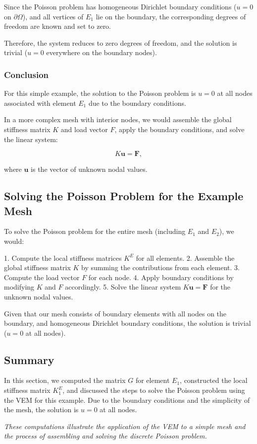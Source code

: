 \documentclass[class=article, crop=false]{standalone}
\begin{document}
Since the Poisson problem has homogeneous Dirichlet boundary conditions ($u = 0$ on $\partial\Omega$), and all vertices of $E_1$ lie on the boundary, the corresponding degrees of freedom are known and set to zero.

Therefore, the system reduces to zero degrees of freedom, and the solution is trivial ($u = 0$ everywhere on the boundary nodes).

\subsubsection{Conclusion}

For this simple example, the solution to the Poisson problem is $u = 0$ at all nodes associated with element $E_1$ due to the boundary conditions.

In a more complex mesh with interior nodes, we would assemble the global stiffness matrix $K$ and load vector $F$, apply the boundary conditions, and solve the linear system:

\[
K \mathbf{u} = \mathbf{F},
\]

where $\mathbf{u}$ is the vector of unknown nodal values.

\subsection{Solving the Poisson Problem for the Example Mesh}

To solve the Poisson problem for the entire mesh (including $E_1$ and $E_2$), we would:

1. Compute the local stiffness matrices $K^E$ for all elements.
2. Assemble the global stiffness matrix $K$ by summing the contributions from each element.
3. Compute the load vector $F$ for each node.
4. Apply boundary conditions by modifying $K$ and $F$ accordingly.
5. Solve the linear system $K \mathbf{u} = \mathbf{F}$ for the unknown nodal values.

Given that our mesh consists of boundary elements with all nodes on the boundary, and homogeneous Dirichlet boundary conditions, the solution is trivial ($u = 0$ at all nodes).

\subsection{Summary}

In this section, we computed the matrix $G$ for element $E_1$, constructed the local stiffness matrix $K_1^E$, and discussed the steps to solve the Poisson problem using the VEM for this example. Due to the boundary conditions and the simplicity of the mesh, the solution is $u = 0$ at all nodes.

\noindent
\textit{These computations illustrate the application of the VEM to a simple mesh and the process of assembling and solving the discrete Poisson problem.}
\end{document}
